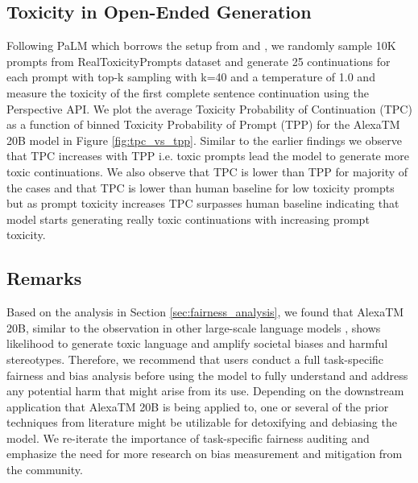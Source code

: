 \subsection{Toxicity in Open-Ended Generation}

Following PaLM \citep{Chowdhery2022PaLMSL} which borrows the setup from \citep{welbl-etal-2021-challenges-detoxifying} and \citep{rae2021scaling}, we randomly sample 10K prompts from RealToxicityPrompts dataset \citep{RealToxicityPrompts2020} and generate 25 continuations for each prompt with top-k sampling with k=40 and a temperature of 1.0 and measure the toxicity of the first complete sentence continuation using the Perspective API. We plot the average Toxicity Probability of Continuation (TPC) as a function of binned Toxicity Probability of Prompt (TPP) for the {AlexaTM 20B} model in Figure \ref{fig:tpc_vs_tpp}. Similar to the earlier findings we observe that TPC increases with TPP i.e. toxic prompts lead the model to generate more toxic continuations. We also observe that TPC is lower than TPP for majority of the cases and that TPC is lower than human baseline for low toxicity prompts but as prompt toxicity increases TPC surpasses human baseline indicating that model starts generating really toxic continuations with increasing prompt toxicity.

\subsection{Remarks}

Based on the analysis in Section \ref{sec:fairness_analysis}, we found that {AlexaTM 20B}, similar to the observation in other large-scale language models \citep{Du2022GLaMES, Chowdhery2022PaLMSL,Zhang2022OPTOP}, shows likelihood to generate toxic language and amplify societal biases and harmful stereotypes. Therefore, we recommend that users conduct a full task-specific fairness and bias analysis before using the model to fully understand and address any potential harm that might arise from its use. Depending on the downstream application that {AlexaTM 20B} is being applied to, one or several of the prior techniques from literature \citep{gupta-etal-2022-mitigating, dathathri2019plug, dinan-etal-2019-build, sheng-etal-2021-societal, dinan-etal-2020-queens, liu-etal-2020-gender, sheng-etal-2019-woman, roller-etal-2021-recipes, Liang2021TowardsUA, Dinan2021AnticipatingSI, Dhamala2021BOLDDA, schick-etal-2021-self, Ouyang2022TrainingLM} might be utilizable for detoxifying and debiasing the model. We re-iterate the importance of task-specific fairness auditing and emphasize the need for more research on bias measurement and mitigation from the community.

